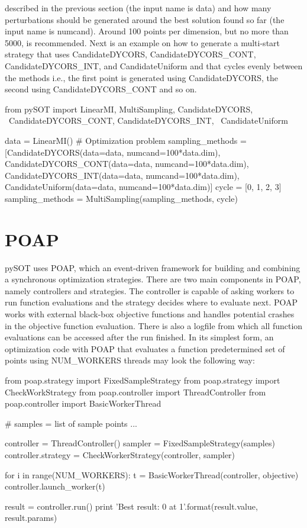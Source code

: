 \documentclass[]{article}
\begin{document}
described in the previous section (the input name is data) and how many 
perturbations should be generated around the best solution found so far 
(the input name is numcand). Around 100 points per dimension, but no more 
than 5000, is recommended. Next is an example on how to generate a multi-start 
strategy that uses CandidateDYCORS, CandidateDYCORS\_CONT, 
CandidateDYCORS\_INT, and CandidateUniform and that cycles evenly between 
the methods i.e., the first point is generated using CandidateDYCORS, the 
second using CandidateDYCORS\_CONT and so on.
\begin{python}
from pySOT import LinearMI, MultiSampling, CandidateDYCORS, \
			  CandidateDYCORS_CONT, CandidateDYCORS_INT, \
			  CandidateUniform

data = LinearMI()  # Optimization problem
sampling_methods = [CandidateDYCORS(data=data, numcand=100*data.dim),
                     CandidateDYCORS_CONT(data=data, numcand=100*data.dim),
                     CandidateDYCORS_INT(data=data, numcand=100*data.dim),
                     CandidateUniform(data=data, numcand=100*data.dim)]
cycle = [0, 1, 2, 3]
sampling_methods = MultiSampling(sampling_methods, cycle)
\end{python}

\section{POAP}
pySOT uses POAP, which an event-driven framework for building and combining a
synchronous optimization strategies. There are two main components in POAP, 
namely controllers and strategies. The controller is  capable of asking workers to 
run function evaluations and the strategy decides where to evaluate next. POAP 
works with external black-box objective functions and handles potential crashes 
in the objective function evaluation. There is also a logfile from which all function 
evaluations can be accessed after the run finished. In its simplest form, an 
optimization code with POAP that evaluates a function predetermined set of 
points using NUM\_WORKERS threads may look the following way:

\begin{python}
from poap.strategy import FixedSampleStrategy
from poap.strategy import CheckWorkStrategy
from poap.controller import ThreadController
from poap.controller import BasicWorkerThread

# samples = list of sample points ...

controller = ThreadController()
sampler = FixedSampleStrategy(samples)
controller.strategy = CheckWorkerStrategy(controller, sampler)

for i in range(NUM_WORKERS):
    t = BasicWorkerThread(controller, objective)
    controller.launch_worker(t)

result = controller.run()
print 'Best result: {0} at {1}'.format(result.value, result.params)
\end{python}
\end{document}

